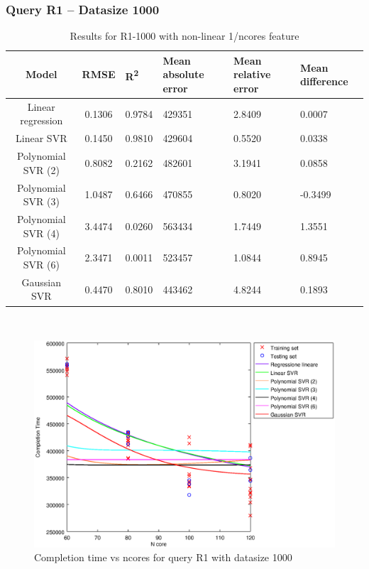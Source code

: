 \documentclass[a4paper,11pt]{article}
\begin{document}
\newpage
\subsubsection{Query R1 -- Datasize 1000}
\begin{table}[H]
	\centering
	\begin{adjustbox}{center}
		\begin{tabular}{c | c M{1.2cm} M{2.5cm} M{2.5cm} M{1.8cm}}
			Model & RMSE & R\textsuperscript{2} & Mean absolute error & Mean relative error & Mean difference \tabularnewline
			\hline
			Linear regression & 0.1306 & 0.9784 & 429351 & 2.8409 & 0.0007 \\
			Linear SVR & 0.1450 & 0.9810 & 429604 & 0.5520 & 0.0338 \\
			Polynomial SVR (2) & 0.8082 & 0.2162 & 482601 & 3.1941 & 0.0858 \\
			Polynomial SVR (3) & 1.0487 & 0.6466 & 470855 & 0.8020 & -0.3499 \\
			Polynomial SVR (4) & 3.4474 & 0.0260 & 563434 & 1.7449 & 1.3551 \\
			Polynomial SVR (6) & 2.3471 & 0.0011 & 523457 & 1.0844 & 0.8945 \\
			Gaussian SVR & 0.4470 & 0.8010 & 443462 & 4.8244 & 0.1893 \\
		\end{tabular}
	\end{adjustbox}
	\\
	\caption{Results for R1-1000 with non-linear 1/ncores feature}
	\label{table_R1_prediction_all}
\end{table}

\begin {figure}[hbtp]
\centering
\includegraphics[width=\textwidth]{output/R1_1000_1_OVER_NCORES/plot_R1_1000.eps}
\caption {Completion time vs ncores for query R1 with datasize 1000}
\end {figure}
\end{document}
